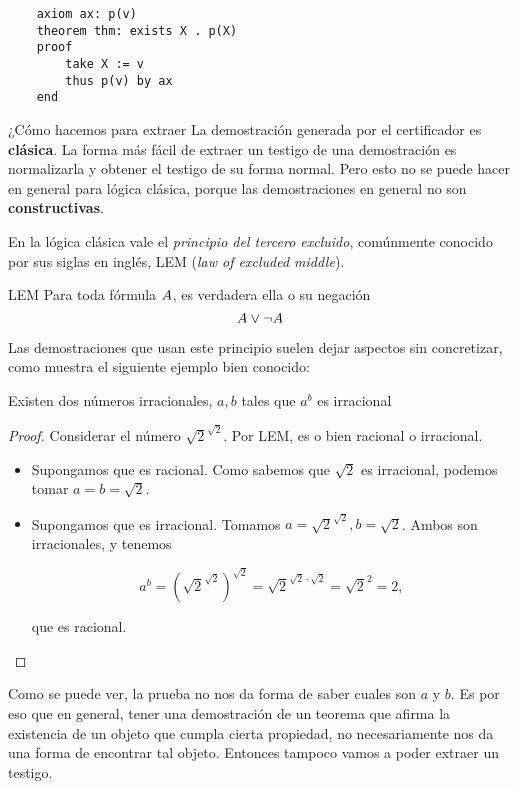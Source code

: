 \begin{verbatim}
    axiom ax: p(v)
    theorem thm: exists X . p(X)
    proof
        take X := v
        thus p(v) by ax
    end
\end{verbatim}

¿Cómo hacemos para extraer La demostración generada por el certificador es \textbf{clásica}. La forma más
fácil de extraer un testigo de una demostración es normalizarla y obtener el
testigo de su forma normal. Pero esto no se puede hacer en general para lógica
clásica, porque las demostraciones en general no son \textbf{constructivas}.

En la lógica clásica vale el \textit{principio del tercero excluido}, comúnmente
conocido por sus siglas en inglés, LEM (\textit{law of excluded middle}).

\begin{prop}{LEM} Para toda fórmula $A$, es verdadera ella o su negación
    \[ A \vee \neg A \]
\end{prop}

Las demostraciones que usan este principio suelen dejar aspectos sin
concretizar, como muestra el siguiente ejemplo bien conocido:

\begin{theorem}\label{thm:irrat}
    Existen dos números irracionales, $a, b$ tales que $a^b$ es irracional
\end{theorem}
\begin{proof}
    Considerar el número $\sqrt{2}^{\sqrt{2}}$. Por LEM, es o bien racional o
    irracional.
    \begin{itemize}
        \item Supongamos que es racional. Como sabemos que $\sqrt{2}$ es
        irracional, podemos tomar $a=b=\sqrt{2}$.
        \item Supongamos que es irracional. Tomamos $a = \sqrt{2}^{\sqrt{2}}, b
        = \sqrt{2}$. Ambos son irracionales, y tenemos

        \[
            a^b
            = \left( \sqrt{2}^{\sqrt{2}} \right)^{\sqrt{2}}
            = \sqrt{2}^{\sqrt{2} \cdot \sqrt{2}}
            = \sqrt{2}^{2}
            = 2,
        \]

        que es racional.
    \end{itemize}
\end{proof}

Como se puede ver, la prueba no nos da forma de saber cuales son $a$ y $b$. Es
por eso que en general, tener una demostración de un teorema que afirma la
existencia de un objeto que cumpla cierta propiedad, no necesariamente nos da
una forma de encontrar tal objeto. Entonces tampoco vamos a poder extraer un
testigo.

